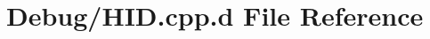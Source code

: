 \hypertarget{_debug_2_h_i_d_8cpp_8d}{\section{\-Debug/\-H\-I\-D.cpp.\-d \-File \-Reference}
\label{_debug_2_h_i_d_8cpp_8d}
}
